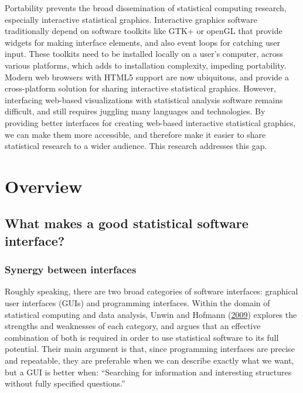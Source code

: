 \documentclass[12pt,]{isuthesis}
\begin{document}
Portability prevents the broad dissemination of statistical computing
research, especially interactive statistical graphics. Interactive
graphics software traditionally depend on software toolkits like GTK+ or
openGL that provide widgets for making interface elements, and also
event loops for catching user input. These toolkits need to be installed
locally on a user's computer, across various platforms, which adds to
installation complexity, impeding portability. Modern web browsers with
HTML5 support are now ubiquitous, and provide a cross-platform solution
for sharing interactive statistical graphics. However, interfacing
web-based visualizations with statistical analysis software remains
difficult, and still requires juggling many languages and technologies.
By providing better interfaces for creating web-based interactive
statistical graphics, we can make them more accessible, and therefore
make it easier to share statistical research to a wider audience. This
research addresses this gap.

\chapter{Overview}

\section{What makes a good statistical software
interface?}\label{what-makes-a-good-statistical-software-interface}

\subsection{Synergy between
interfaces}\label{synergy-between-interfaces}

Roughly speaking, there are two broad categories of software interfaces:
graphical user interfaces (GUIs) and programming interfaces. Within the
domain of statistical computing and data analysis, Unwin and Hofmann
(\protect\hyperlink{ref-Unwin:1999vp}{2009}) explores the strengths and
weaknesses of each category, and argues that an effective combination of
both is required in order to use statistical software to its full
potential. Their main argument is that, since programming interfaces are
precise and repeatable, they are preferable when we can describe exactly
what we want, but a GUI is better when: ``Searching for information and
interesting structures without fully specified questions.''
\end{document}
